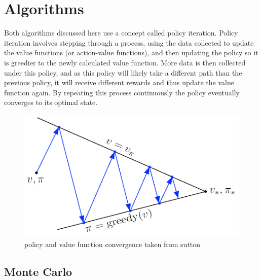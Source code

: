 \section{Algorithms}\label{algorithms}
Both algorithms discussed here use a concept called policy iteration. Policy iteration involves stepping through a process, using the data collected to update the value functions (or action-value functions), and then updating the policy so it is greedier to the newly calculated value function. More data is then collected under this policy, and as this policy will likely take a different path than the previous policy, it will receive different rewards and thus update the value function again. By repeating this process continuously the policy eventually converges to its optimal state. 

\begin{figure}[h]
\centering
\includegraphics[width=.5\textwidth]{images/gpi2}
\caption[policy and value function convergence]{policy and value function convergence taken from sutton}
\end{figure}
\newpage
\subsection{Monte Carlo}

